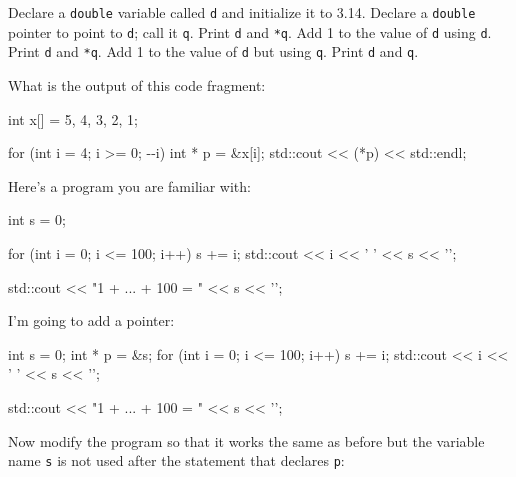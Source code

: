 \begin{ex}
Declare a \texttt{double} variable called \texttt{d} and initialize it to 3.14. Declare a \texttt{double} pointer to point to \texttt{d}; call it \texttt{q}. Print \texttt{d} and \texttt{*q}. Add 1 to the value of \texttt{d} using \texttt{d}. Print \texttt{d} and \texttt{*q}. Add 1 to the value of \texttt{d} but using \texttt{q}. Print \texttt{d} and \texttt{q}.
\end{ex}

\begin{ex}
What is the output of this code fragment:

\begin{consolethree}[escapeinside=||]
int x[] = {5, 4, 3, 2, 1};

for (int i = 4; i >= 0; -\/-i)
{   
    int * p = &x[i];
    std::cout << (*p) << std::endl;
}
\end{consolethree}
\end{ex}

\begin{ex}
Here's a program you are familiar with:

\begin{consolethree}[escapeinside=||]
int s = 0;

for (int i = 0; i <= 100; i++)
{   
    s += i;
    std::cout << i << ' ' << s << '\n';
}

std::cout << "1 + ... + 100 = " << s << '\n';
\end{consolethree}
I'm going to add a pointer:

\begin{consolethree}[escapeinside=||]
int s = 0;
int * p = &s;
for (int i = 0; i <= 100; i++)
{   
    s += i;
    std::cout << i << ' ' << s << '\n';
}

std::cout << "1 + ... + 100 = " << s << '\n';
\end{consolethree}

Now modify the program so that it works the same as before but the variable name \texttt{s} is not used after the statement that declares \texttt{p}:
\end{ex}


